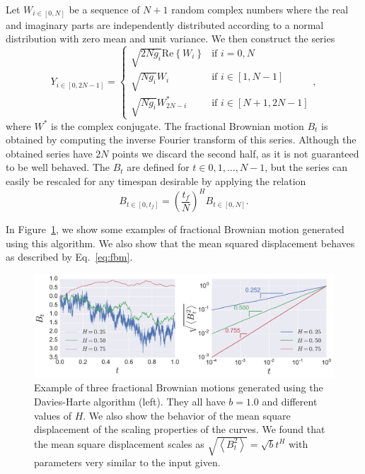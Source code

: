 Let $W_{i\in[0,N]}$ be a sequence of $N+1$ random complex numbers where the
real and imaginary parts are independently distributed according to a normal
distribution with zero mean and unit variance. We then construct the series
\begin{equation}
    Y_{i\in[0,2N-1]}=\begin{cases}
        \sqrt{2Ng_{i}}\mbox{Re}\left\{ W_{i}\right\}  & \mbox{if } i=0,N\\
        \sqrt{Ng_{i}}W_{i} & \mbox{if } i\in\left[1, N-1\right]\\
        \sqrt{Ng_{i}}W_{2N-i}^{*} & \mbox{if } i\in\left[N+1, 2N-1\right]
    \end{cases},
\end{equation}
where $W^{*}$ is the complex conjugate. The fractional Brownian motion $B_t$ is
obtained by computing the inverse Fourier transform of this series. Although
the obtained series have $2N$ points we discard the second half, as it is not
guaranteed to be well behaved. The $B_t$ are defined for $t\in{0,1,\ldots,N-1}$,
but the series can easily be rescaled for any timespan desirable by applying
the relation
\begin{equation}
    B_{t\in[0,t_{f}]}={\left(\frac{t_{f}}{N}\right)}^{H}B_{t\in[0,N]}.
\end{equation}

In Figure~\ref{fig:fbm}, we show some examples of fractional Brownian motion
generated using this algorithm. We also show that the mean squared displacement
behaves as described by Eq.~\ref{eq:fbm}.

\begin{figure}
\begin{center}
    \includegraphics[scale=0.45]{chapters/ch6-asle/figs/fbm}
\end{center}
\caption{Example of three fractional Brownian motions generated using the
    Davies-Harte algorithm (left). They all have $b=1.0$ and different values
    of $H$. We also show the behavior of the mean square displacement of the
    scaling properties of the curves. We found that the mean square displacement
    scales as $\sqrt{\left\langle B_t^2\right\rangle}=\sqrt{b}t^H$ with
    parameters very similar to the input given.}
\label{fig:fbm}
\end{figure}
